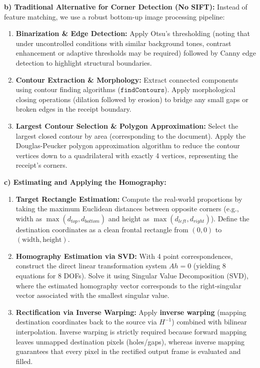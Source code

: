 \textbf{b) Traditional Alternative for Corner Detection (No SIFT):}
Instead of feature matching, we use a robust bottom-up image processing pipeline:
\begin{enumerate}
    \item \textbf{Binarization \& Edge Detection:} Apply Otsu's thresholding (noting that under uncontrolled conditions with similar background tones, contrast enhancement or adaptive thresholds may be required) followed by Canny edge detection to highlight structural boundaries.
    \item \textbf{Contour Extraction \& Morphology:} Extract connected components using contour finding algorithms ($\texttt{findContours}$). Apply morphological closing operations (dilation followed by erosion) to bridge any small gaps or broken edges in the receipt boundary.
    \item \textbf{Largest Contour Selection \& Polygon Approximation:} Select the largest closed contour by area (corresponding to the document). Apply the Douglas-Peucker polygon approximation algorithm to reduce the contour vertices down to a quadrilateral with exactly 4 vertices, representing the receipt's corners.
\end{enumerate}

\textbf{c) Estimating and Applying the Homography:}
\begin{enumerate}
    \item \textbf{Target Rectangle Estimation:} Compute the real-world proportions by taking the maximum Euclidean distances between opposite corners (e.g., width as $\max(d_{top}, d_{bottom})$ and height as $\max(d_{left}, d_{right})$). Define the destination coordinates as a clean frontal rectangle from $(0,0)$ to $(\text{width}, \text{height})$.
    \item \textbf{Homography Estimation via SVD:} With 4 point correspondences, construct the direct linear transformation system $Ah = 0$ (yielding 8 equations for 8 DOFs). Solve it using Singular Value Decomposition (SVD), where the estimated homography vector corresponds to the right-singular vector associated with the smallest singular value.
    \item \textbf{Rectification via Inverse Warping:} Apply \textbf{inverse warping} (mapping destination coordinates back to the source via $H^{-1}$) combined with bilinear interpolation. Inverse warping is strictly required because forward mapping leaves unmapped destination pixels (holes/gaps), whereas inverse mapping guarantees that every pixel in the rectified output frame is evaluated and filled.
\end{enumerate}

